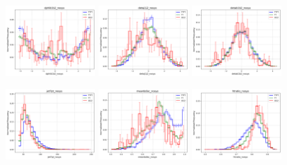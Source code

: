\documentclass[twoside]{article}
\begin{document}
\begin{figure}[H]
    \centering
    \includegraphics[width=0.3\textwidth]{plots/evtbdt/input_vars/dphib1b2_nosys.png}
    \hfill
    \includegraphics[width=0.3\textwidth]{plots/evtbdt/input_vars/detaj1j2_nosys.png}
    \hfill
    \includegraphics[width=0.3\textwidth]{plots/evtbdt/input_vars/detab1b2_nosys.png}
\end{figure}

\begin{figure}[H]
    \centering
    \includegraphics[width=0.3\textwidth]{plots/evtbdt/input_vars/jet7pt_nosys.png}
    \hfill
    \includegraphics[width=0.3\textwidth]{plots/evtbdt/input_vars/meanbdisc_nosys.png}
    \hfill
    \includegraphics[width=0.3\textwidth]{plots/evtbdt/input_vars/htratio_nosys.png}
\end{figure}
\end{document}
